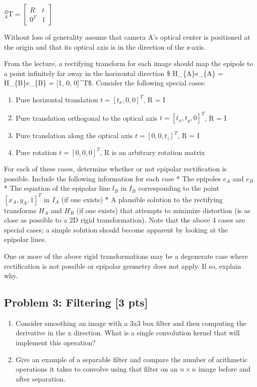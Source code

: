 \documentclass[11pt]{article}
\begin{document}
\(_{A}^{B}\textrm{T}= \begin{bmatrix} R & t \\ 0^T & 1 \end{bmatrix}\)

Without loss of generality assume that camera A's optical center is
positioned at the origin and that its optical axis is in the direction
of the z-axis.

From the lecture, a rectifying transform for each image should map the
epipole to a point infinitely far away in the horizontal direction \$
H\_\{A\}e\_\{A\} = H\_\{B\}e\_\{B\} = {[}1, 0, 0{]}\^{}T\$. Consider the
following special cases:

\begin{enumerate}
\def\labelenumi{\alph{enumi})}
\item
  Pure horizontal translation \(t = [t_x, 0, 0]^T\), R = I
\item
  Pure translation orthogonal to the optical axis
  \(t = [t_x, t_y, 0]^T\), R = I
\item
  Pure translation along the optical axis \(t = [0, 0, t_z]^T\), R = I
\item
  Pure rotation \(t = [0, 0, 0]^T\), R is an arbitrary rotation matrix
\end{enumerate}

For each of these cases, determine whether or not epipolar rectification
is possible. Include the following information for each case * The
epipoles \(e_A\) and \(e_B\) * The equation of the epipolar line \(l_B\)
in \(I_B\) corresponding to the point \([x_A, y_A, 1]^T\) in \(I_A\) (if
one exists) * A plausible solution to the rectifying transforms \(H_A\)
and \(H_B\) (if one exists) that attempts to minimize distortion (is as
close as possible to a 2D rigid transformation). Note that the above 4
cases are special cases; a simple solution should become apparent by
looking at the epipolar lines.

One or more of the above rigid transformations may be a degenerate case
where rectification is not possible or epipolar geometry does not apply.
If so, explain why.

    \hypertarget{problem-3-filtering-3-pts}{%
\subsection{Problem 3: Filtering {[}3
pts{]}}\label{problem-3-filtering-3-pts}}

\begin{enumerate}
\def\labelenumi{\alph{enumi})}
\item
  Consider smoothing an image with a 3x3 box filter and then computing
  the derivative in the x direction. What is a single convolution kernel
  that will implement this operation?
\item
  Give an example of a separable filter and compare the number of
  arithmetic operations it takes to convolve using that filter on an
  \(n \times n\) image before and after separation.
\end{enumerate}
\end{document}
